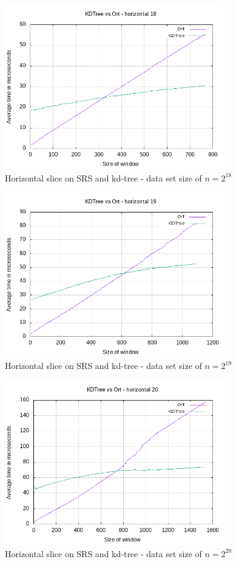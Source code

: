 \begin{figure}[h]
    \centering
    \includegraphics[width = 0.85\textwidth]{pictures/analysis/hori_18.png}
    \caption{Horizontal slice on SRS and kd-tree - data set size of $n=2^{18}$}\label{fig:hori_18}
\end{figure}


\begin{figure}[h]
    \centering
    \includegraphics[width = 0.85\textwidth]{pictures/analysis/hori_19.png}
    \caption{Horizontal slice on SRS and kd-tree - data set size of $n=2^{19}$}\label{fig:hori_19}
\end{figure}


\begin{figure}[h]
    \centering
    \includegraphics[width = 0.85\textwidth]{pictures/analysis/hori_20.png}
    \caption{Horizontal slice on SRS and kd-tree - data set size of $n=2^{20}$}\label{fig:hori_20}
\end{figure}
